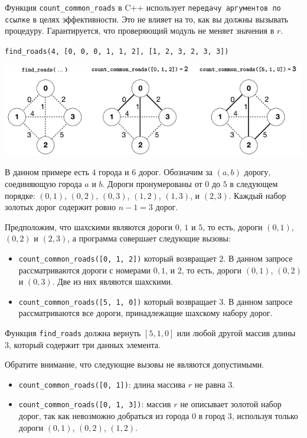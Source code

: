 Функция \texttt{count\_common\_roads} в C++ использует \texttt{передачу аргументов по ссылке} в целях эффективности. Это не влияет на то, как вы должны вызывать процедуру.
Гарантируется, что проверяющий модуль не меняет значения в $r$.

\texttt{find\_roads(4, [0, 0, 0, 1, 1, 2], [1, 2, 3, 2, 3, 3])}


\includegraphics[scale=0.7]{1.png}

В данном примере есть $4$ города и $6$ дорог. Обозначим за $(a, b)$ дорогу, соединяющую города $a$ и $b$. Дороги пронумерованы от $0$ до $5$ в следующем порядке: $(0, 1)$, $(0, 2)$, $(0, 3)$, $(1, 2)$, $(1, 3)$, и $(2, 3)$. Каждый набор золотых дорог содержит ровно $n - 1 = 3$ дорог.

Предположим, что шахскими являются дороги $0$, $1$ и $5$, то есть, дороги $(0, 1)$, $(0, 2)$ и $(2, 3)$, а программа совершает следующие вызовы:

\begin{itemize}
\item \texttt{count\_common\_roads([0, 1, 2])} который возвращает $2$. В данном запросе
рассматриваются дороги с номерами $0, 1$, и $2$, то есть, дороги $(0, 1)$, $(0, 2)$ и $(0,3)$. Две из них являются шахскими.
\item \texttt{count\_common\_roads([5, 1, 0])} который возвращает $3$. В данном запросе
рассматриваются все дороги, принадлежащие шахскому набору дорог.
\end{itemize}

Функция \texttt{find\_roads} должна вернуть $[5, 1, 0]$ или любой другой массив длины $3$, который содержит три данных элемента.

Обратите внимание, что следующие вызовы не являются допустимыми.
\begin{itemize}
\item \texttt{count\_common\_roads([0, 1])}: длина массива $r$ не равна $3$.
\item \texttt{count\_common\_roads([0, 1, 3])}: массив $r$ не описывает золотой набор дорог, так как невозможно добраться из города $0$ в город $3$, используя только дороги $(0,1)$, $(0,2)$, $(1,2)$.
\end{itemize}